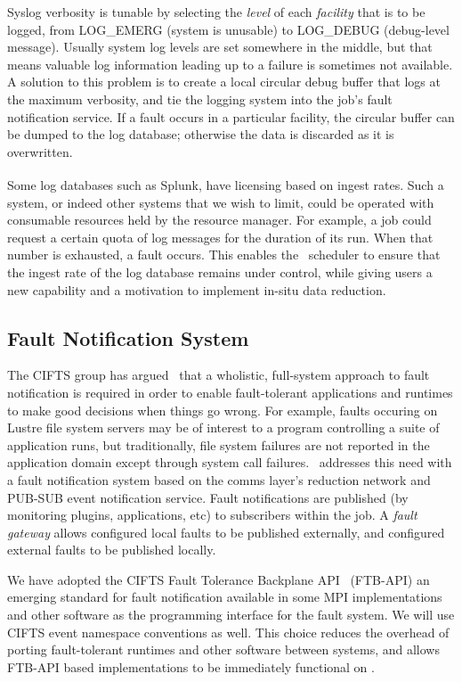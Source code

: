 Syslog verbosity is tunable by selecting the {\em level} of each
{\em facility} that is to be logged, from LOG\_EMERG (system is unusable)
to LOG\_DEBUG (debug-level message).  Usually system log levels are set
somewhere in the middle, but that means valuable log information leading
up to a failure is sometimes not available.  A solution to this problem is
to create a local circular debug buffer that logs at the maximum verbosity,
and tie the logging system into the job's fault notification service.
If a fault occurs in a particular facility, the circular buffer can be
dumped to the log database; otherwise the data is discarded as it is
overwritten.

Some log databases such as Splunk\textsuperscript{\textregistered},
have licensing based on ingest rates.  Such a system, or indeed other
systems that we wish to limit, could be operated with consumable resources
held by the resource manager.  For example, a job could request a certain
quota of log messages for the duration of its run.  When that number
is exhausted, a fault occurs.  This enables the \ngrm\ scheduler to ensure
that the ingest rate of the log database remains under control, while
giving users a new capability and a motivation to implement in-situ data
reduction.

\subsection{Fault Notification System}

The CIFTS group has argued~\cite{CIFTS} that a wholistic, full-system approach
to fault notification is required in order to enable fault-tolerant
applications and runtimes to make good decisions when things go wrong.
For example, faults occuring on Lustre file system servers may be of interest
to a program controlling a suite of application runs, but traditionally,
file system failures are not reported in the application domain except
through system call failures.
\ngrm\ addresses this need with a fault notification system based on
the comms layer's reduction network and PUB-SUB event notification service.
Fault notifications are published (by monitoring plugins, applications, etc)
to subscribers within the job.
A {\em fault gateway} allows configured local faults to be published externally,
and configured external faults to be published locally.

We have adopted the 
CIFTS Fault Tolerance Backplane API~\cite{FTBAPI} (FTB-API)
an emerging standard for fault notification available in some MPI
implementations and other software as the programming interface for the
fault system.  We will use CIFTS event namespace conventions as well.
This choice reduces the overhead of porting fault-tolerant runtimes and
other software between systems, and allows FTB-API based implementations
to be immediately functional on \ngrm.

